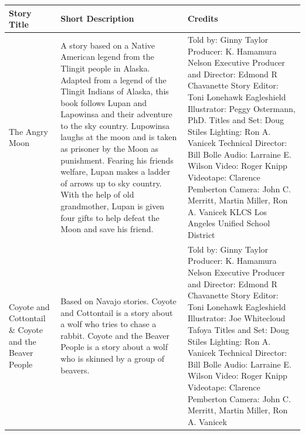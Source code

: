 \begin{table}[h]
    \centering
    \begin{small}

        \begin{tabular}{|p{1.5cm}|p{7cm}|p{7cm}|}
            \hline
            \textbf{Story Title} & \textbf{Short Description} & \textbf{Credits} \\
            \hline
            The Angry Moon
                                 &
            A story based on a Native American legend from the Tlingit people in Alaska.
            Adapted from a legend of the Tlingit Indians of Alaska, this book follows Lupan and Lapowinsa and their adventure to the sky country.
            Lupowinsa laughs at the moon and is taken as prisoner by the Moon as punishment.
            Fearing his friends welfare, Lupan makes a ladder of arrows up to sky country.
            With the help of old grandmother, Lupan is given four gifts to help defeat the Moon and save his friend.
                                 &
            Told by: Ginny Taylor
            Producer: K. Hamamura Nelson
            Executive Producer and Director: Edmond R Chavanette
            Story Editor: Toni Lonehawk Eagleshield
            Illustrator: Peggy Ostermann, PhD.
            Titles and Set: Doug Stiles
            Lighting: Ron A. Vanicek
            Technical Director: Bill Bolle
            Audio: Larraine E. Wilson
            Video: Roger Knipp
            Videotape: Clarence Pemberton
            Camera: John C. Merritt, Martin Miller, Ron A. Vanicek
            KLCS Los Angeles Unified School District
            \\
            \hline
            Coyote and Cottontail \& Coyote and the Beaver People
                                 &
            Based on Navajo stories.
            Coyote and Cottontail is a story about a wolf who tries to chase a rabbit.
            Coyote and the Beaver People is a story about a wolf who is skinned by a group of beavers.
                                 &
            Told by: Ginny Taylor
            Producer: K. Hamamura Nelson
            Executive Producer and Director: Edmond R Chavanette
            Story Editor: Toni Lonehawk Eagleshield
            Illustrator: Joe Whitecloud Tafoya
            Titles and Set: Doug Stiles
            Lighting: Ron A. Vanicek
            Technical Director: Bill Bolle
            Audio: Larraine E. Wilson
            Video: Roger Knipp
            Videotape: Clarence Pemberton
            Camera: John C. Merritt, Martin Miller, Ron A. Vanicek

\end{tabular}
\end{small}
\end{table}
